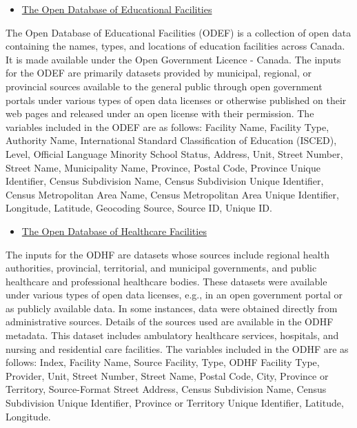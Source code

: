 \documentclass[
11pt, %
oneside, %
english, %
singlespacing, %
]{macthesis} %
\def\tightlist{}
\begin{document}
\begin{itemize}
\tightlist
\item
  \href{https://www.statcan.gc.ca/en/lode/databases/odef}{The Open Database of Educational Facilities}
\end{itemize}

The Open Database of Educational Facilities (ODEF) is a collection of open data containing the names, types, and locations of education facilities across Canada. It is made available under the Open Government Licence - Canada. The inputs for the ODEF are primarily datasets provided by municipal, regional, or provincial sources available to the general public through open government portals under various types of open data licenses or otherwise published on their web pages and released under an open license with their permission. The variables included in the ODEF are as follows: Facility Name, Facility Type, Authority Name, International Standard Classification of Education (ISCED), Level, Official Language Minority School Status, Address, Unit, Street Number, Street Name, Municipality Name, Province, Postal Code, Province Unique Identifier, Census Subdivision Name, Census Subdivision Unique Identifier, Census Metropolitan Area Name, Census Metropolitan Area Unique Identifier, Longitude, Latitude, Geocoding Source, Source ID, Unique ID.

\begin{itemize}
\tightlist
\item
  \href{https://www.statcan.gc.ca/en/lode/databases/odhf}{The Open Database of Healthcare Facilities}
\end{itemize}

The inputs for the ODHF are datasets whose sources include regional health authorities, provincial, territorial, and municipal governments, and public healthcare and professional healthcare bodies. These datasets were available under various types of open data licenses, e.g., in an open government portal or as publicly available data. In some instances, data were obtained directly from administrative sources. Details of the sources used are available in the ODHF metadata. This dataset includes ambulatory healthcare services, hospitals, and nursing and residential care facilities. The variables included in the ODHF are as follows: Index, Facility Name, Source Facility, Type, ODHF Facility Type, Provider, Unit, Street Number, Street Name, Postal Code, City, Province or Territory, Source-Format Street Address, Census Subdivision Name, Census Subdivision Unique Identifier, Province or Territory Unique Identifier, Latitude, Longitude.
\end{document}
